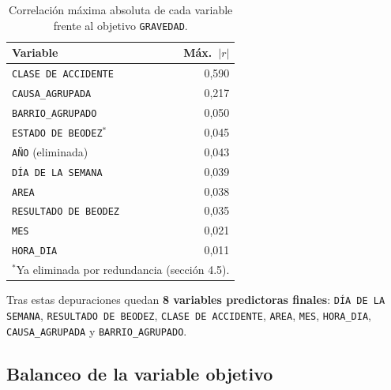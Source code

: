 \documentclass[11pt]{article}
\newcommand{\vartxt}[1]{\texttt{#1}}
\begin{document}
\begin{table}[H]
\centering\small
\caption{Correlación máxima absoluta de cada variable frente al objetivo \vartxt{GRAVEDAD}.}
\label{tab:corr}
\begin{tabular}{lr}
\toprule
\textbf{Variable} & \textbf{Máx.\ $|r|$} \\
\midrule
\vartxt{CLASE DE ACCIDENTE} & 0,590 \\
\vartxt{CAUSA\_AGRUPADA} & 0,217 \\
\vartxt{BARRIO\_AGRUPADO} & 0,050 \\
\vartxt{ESTADO DE BEODEZ}$^{\ast}$ & 0,045 \\
\vartxt{AÑO} (eliminada) & 0,043 \\
\vartxt{DÍA DE LA SEMANA} & 0,039 \\
\vartxt{AREA} & 0,038 \\
\vartxt{RESULTADO DE BEODEZ} & 0,035 \\
\vartxt{MES} & 0,021 \\
\vartxt{HORA\_DIA} & 0,011 \\
\bottomrule
\multicolumn{2}{l}{\footnotesize $^{\ast}$Ya eliminada por redundancia (sección 4.5).}
\end{tabular}
\end{table}

Tras estas depuraciones quedan \textbf{8 variables predictoras finales}: \vartxt{DÍA DE LA SEMANA}, \vartxt{RESULTADO DE BEODEZ}, \vartxt{CLASE DE ACCIDENTE}, \vartxt{AREA}, \vartxt{MES}, \vartxt{HORA\_DIA}, \vartxt{CAUSA\_AGRUPADA} y \vartxt{BARRIO\_AGRUPADO}.

\subsection{Balanceo de la variable objetivo}
\label{sec:balanceo}
\end{document}
